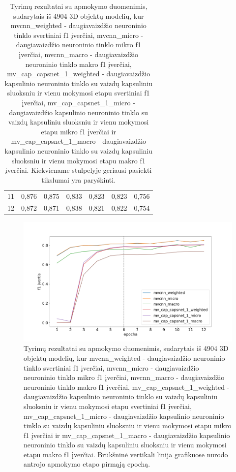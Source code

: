 \begin{table}[]
\begin{tabular}{l|l|l|l|l|l|l}
		11 &          0,876 &       0,875 &       0,833 &                     0,823 &                  0,823 &                  0,756 \\
		12 &          0,872 &       0,871 &       0,838 &                     0,821 &                  0,822 &                  0,754 \\
	\end{tabular}
	\caption{
		Tyrimų rezultatai su apmokymo duomenimis, sudarytais iš 4904 3D objektų modelių, kur mvcnn\_weighted -  daugiavaizdžio neuroninio tinklo svertiniai f1 įverčiai, 
		mvcnn\_micro -  daugiavaizdžio neuroninio tinklo mikro f1 įverčiai, 
		mvcnn\_macro -  daugiavaizdžio neuroninio tinklo makro f1 įverčiai, 
		mv\_cap\_capsnet\_1\_weighted - daugiavaizdžio kapsulinio neuroninio tinklo su vaizdų kapsuliniu sluoksniu ir vienu mokymosi etapu svertiniai f1 įverčiai, 
		mv\_cap\_capsnet\_1\_micro - daugiavaizdžio kapsulinio neuroninio tinklo su vaizdų kapsuliniu sluoksniu ir vienu mokymosi etapu mikro f1 įverčiai ir
		mv\_cap\_capsnet\_1\_macro - daugiavaizdžio kapsulinio neuroninio tinklo su vaizdų kapsuliniu sluoksniu ir vienu mokymosi etapu makro f1 įverčiai. Kiekviename stulpelyje geriausi pasiekti tikslumai yra paryškinti.
	}
	\label{tbl:half_sample_f1}
\end{table}

\begin{figure}[H]
	\centering
	\includegraphics[scale=0.4]{img/half_sample_f1.png}
	\caption{
		Tyrimų rezultatai su apmokymo duomenimis, sudarytais iš 4904 3D objektų modelių, kur mvcnn\_weighted -  daugiavaizdžio neuroninio tinklo svertiniai f1 įverčiai, 
		mvcnn\_micro -  daugiavaizdžio neuroninio tinklo mikro f1 įverčiai, 
		mvcnn\_macro -  daugiavaizdžio neuroninio tinklo makro f1 įverčiai, 
		mv\_cap\_capsnet\_1\_weighted - daugiavaizdžio kapsulinio neuroninio tinklo su vaizdų kapsuliniu sluoksniu ir vienu mokymosi etapu svertiniai f1 įverčiai, 
		mv\_cap\_capsnet\_1\_micro - daugiavaizdžio kapsulinio neuroninio tinklo su vaizdų kapsuliniu sluoksniu ir vienu mokymosi etapu mikro f1 įverčiai ir
		mv\_cap\_capsnet\_1\_macro - daugiavaizdžio kapsulinio neuroninio tinklo su vaizdų kapsuliniu sluoksniu ir vienu mokymosi etapu makro f1 įverčiai. Brūkšninė vertikali linija grafikuose nurodo antrojo apmokymo etapo pirmąją epochą.
	}
	\label{img:half_sample_f1}
\end{figure}


